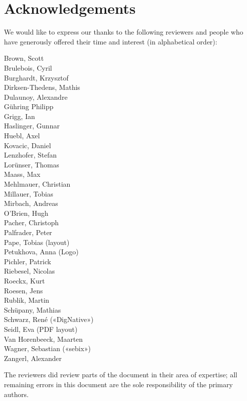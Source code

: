 \clearpage
\section*{Acknowledgements}
\label{section:Reviewers}

We would like to express our thanks to the following reviewers and people who have generously offered their time and interest (in alphabetical order):

\begin{multicols}{2}{\parskip=0pt\centering\obeylines%
Brown, Scott \\
Brulebois, Cyril \\
Burghardt, Krzysztof \\
Dirksen-Thedens, Mathis \\
Dulaunoy, Alexandre \\
Gühring Philipp  \\
Grigg, Ian  \\
Haslinger, Gunnar \\
Huebl, Axel \\
Kovacic, Daniel \\
Lenzhofer, Stefan \\
Lorünser, Thomas \\
Maass, Max \\
Mehlmauer, Christian \\
Millauer, Tobias \\
Mirbach, Andreas \\
O'Brien, Hugh \\
Pacher, Christoph \\
Palfrader, Peter \\
Pape, Tobias (layout) \\
Petukhova, Anna (Logo) \\
Pichler, Patrick \\
Riebesel, Nicolas \\
Roeckx, Kurt \\
Roesen, Jens \\
Rublik, Martin \\
Schüpany, Mathias \\
Schwarz, René («DigNative») \\
Seidl, Eva (PDF layout) \\
Van Horenbeeck, Maarten \\
Wagner, Sebastian («sebix») \\
Zangerl, Alexander \\
}\end{multicols}





The reviewers did review parts of the document in their area of
expertise; all remaining errors in this document are the sole
responsibility of the primary authors.




